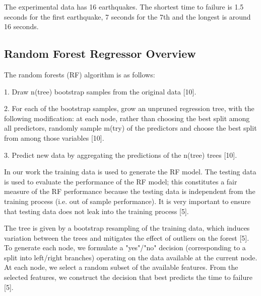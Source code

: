 \documentclass[]{llncs} %
\begin{document}
The experimental data has 16 earthquakes. The shortest time to failure is 1.5 seconds for the first earthquake, 7 seconds for the 7th and the longest is around 16 seconds. \par

\subsection{Random Forest Regressor Overview}
The random forests (RF) algorithm is as follows:\par
1. Draw n(tree) bootstrap samples from the original data [10].\par
2. For each of the bootstrap samples, grow an unpruned regression tree, with the following modification: at each node, rather than choosing the best split among all predictors, randomly sample m(try) of the predictors and choose the best split from among those variables [10].\par
3. Predict new data by aggregating the predictions of the n(tree) trees [10].\par
In our work the training data is used to generate the RF model. The testing data is used to evaluate the performance of the RF model; this constitutes a fair measure of the RF performance because the testing data is independent from the training process (i.e. out of sample performance). It is very important to ensure that testing data does not leak into the training process [5]. \par
The tree is given by a bootstrap resampling of the training data, which induces variation between the trees and mitigates the effect of outliers on the forest [5]. To generate each node, we formulate a "yes"/"no" decision (corresponding to a split into left/right branches) operating on the data available at the current node. At each node, we select a random subset of the available features. From the selected features, we construct the decision that best predicts the time to failure [5].
\end{document}
